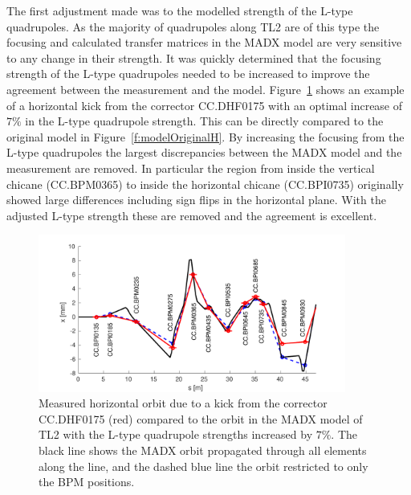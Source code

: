The first adjustment made was to the modelled strength of the L-type quadrupoles. As the majority of quadrupoles along TL2 are of this type the focusing and calculated transfer matrices in the MADX model are very sensitive to any change in their strength. It was quickly determined that the focusing strength of the L-type quadrupoles needed to be increased to improve the agreement between the measurement and the model. Figure~\ref{f:modelCorrQuadH} shows an example of a horizontal kick from the corrector CC.DHF0175 with an optimal increase of \(7\%\) in the L-type quadrupole strength. This can be directly compared to the original model in Figure~\ref{f:modelOriginalH}. By increasing the focusing from the L-type quadrupoles the largest discrepancies between the MADX model and the measurement are removed. In particular the region from inside the vertical chicane (CC.BPM0365) to inside the horizontal chicane (CC.BPI0735) originally showed large differences including sign flips in the horizontal plane. With the adjusted L-type strength these are removed and the agreement is excellent.

\begin{figure}
  \centering
  \includegraphics[width=0.9\textwidth]{Figures/optics/modelCorrQuadH}
  \caption{Measured horizontal orbit due to a kick from the corrector CC.DHF0175 (red) compared to the orbit in the MADX model of TL2 with the L-type quadrupole strengths increased by \(7\%\). The black line shows the MADX orbit propagated through all elements along the line, and the dashed blue line the orbit restricted to only the BPM positions.}
  \label{f:modelCorrQuadH}
\end{figure}

